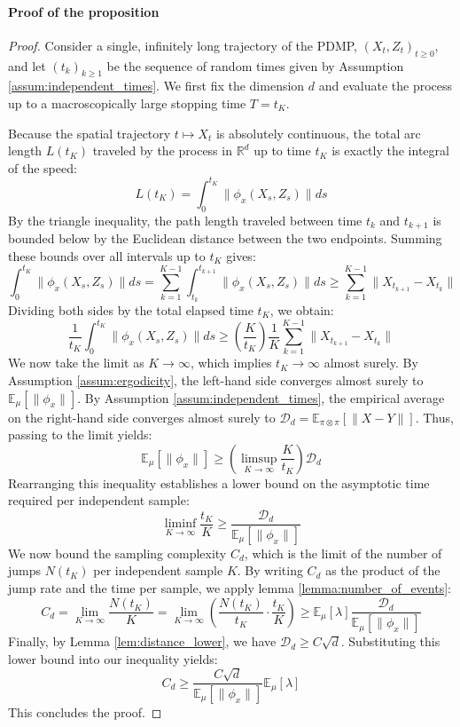 \documentclass{article}
\begin{document}
\paragraph{Proof of the proposition}
\begin{proof}
    Consider a single, infinitely long trajectory of the PDMP, $(X_t, Z_t)_{t \geq 0}$, and let $(t_k)_{k \geq 1}$ be the sequence of random times given by Assumption \ref{assum:independent_times}. We first fix the dimension $d$ and evaluate the process up to a macroscopically large stopping time $T = t_K$.
    
    Because the spatial trajectory $t \mapsto X_t$ is absolutely continuous, the total arc length $L(t_K)$ traveled by the process in $\mathbb{R}^d$ up to time $t_K$ is exactly the integral of the speed:
    \[
        L(t_K) = \int_0^{t_K} \|\phi_x(X_s, Z_s)\| ds
    \]
    By the triangle inequality, the path length traveled between time $t_k$ and $t_{k+1}$ is bounded below by the Euclidean distance between the two endpoints. Summing these bounds over all intervals up to $t_K$ gives:
    \[
        \int_0^{t_K} \|\phi_x(X_s, Z_s)\| ds = \sum_{k=1}^{K-1} \int_{t_k}^{t_{k+1}} \|\phi_x(X_s, Z_s)\| ds \geq \sum_{k=1}^{K-1} \|X_{t_{k+1}} - X_{t_k}\|
    \]
    Dividing both sides by the total elapsed time $t_K$, we obtain:
    \[
        \frac{1}{t_K} \int_0^{t_K} \|\phi_x(X_s, Z_s)\| ds \geq \left( \frac{K}{t_K} \right) \frac{1}{K} \sum_{k=1}^{K-1} \|X_{t_{k+1}} - X_{t_k}\|
    \]
    We now take the limit as $K \to \infty$, which implies $t_K \to \infty$ almost surely. By Assumption \ref{assum:ergodicity}, the left-hand side converges almost surely to $\mathbb{E}_\mu[\|\phi_x\|]$. By Assumption \ref{assum:independent_times}, the empirical average on the right-hand side converges almost surely to $\mathcal{D}_d = \mathbb{E}_{\pi \otimes \pi}[\|X - Y\|]$. Thus, passing to the limit yields:
    \[
        \mathbb{E}_\mu[\|\phi_x\|] \geq \left( \limsup_{K \to \infty} \frac{K}{t_K} \right) \mathcal{D}_d
    \]
    Rearranging this inequality establishes a lower bound on the asymptotic time required per independent sample:
    \[
        \liminf_{K \to \infty} \frac{t_K}{K} \geq \frac{\mathcal{D}_d}{\mathbb{E}_\mu[\|\phi_x\|]}
    \]
    We now bound the sampling complexity $C_d$, which is the limit of the number of jumps $N(t_K)$ per independent sample $K$. By writing $C_d$ as the product of the jump rate and the time per sample, we apply lemma \ref{lemma:number_of_events}:
    \[
        C_d = \lim_{K \to \infty} \frac{N(t_K)}{K} = \lim_{K \to \infty} \left( \frac{N(t_K)}{t_K} \cdot \frac{t_K}{K} \right) \geq \mathbb{E}_\mu[\lambda] \frac{\mathcal{D}_d}{\mathbb{E}_\mu[\|\phi_x\|]}
    \]
    Finally, by Lemma \ref{lem:distance_lower}, we have $\mathcal{D}_d \geq C \sqrt{d}$. Substituting this lower bound into our inequality yields:
    \[
        C_d \geq \frac{C \sqrt{d}}{\mathbb{E}_\mu[\|\phi_x\|]} \mathbb{E}_\mu[\lambda]
    \]
    This concludes the proof.
\end{proof}
\end{document}
